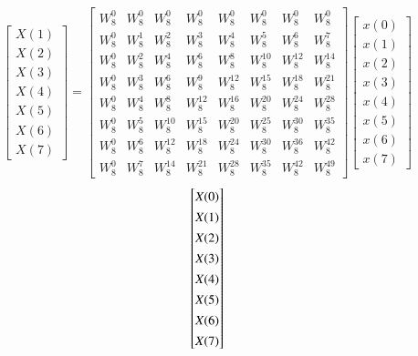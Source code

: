 \documentclass[journal,12pt,twocolumn]{IEEEtran}
\renewcommand\thesection{\arabic{section}}
\begin{document}
\begin{enumerate}[label=\thesection.\arabic*.,ref=\thesection.\theenumi]
\begin{equation}
\begin{bmatrix}
X(1) \\
X(2) \\
X(3) \\
X(4) \\
X(5) \\
X(6) \\
X(7)
\end{bmatrix}
=
\begin{bmatrix}
W^{0}_{8} & W^{0}_{8} & W^{0}_{8} & W^{0}_{8} & W^{0}_{8} & W^{0}_{8} & W^{0}_{8} & W^{0}_{8}\\
W^{0}_{8} & W^{1}_{8} & W^{2}_{8} & W^{3}_{8} & W^{4}_{8} & W^{5}_{8} & W^{6}_{8} & W^{7}_{8}\\
W^{0}_{8} & W^{2}_{8} & W^{4}_{8} & W^{6}_{8} & W^{8}_{8} & W^{10}_{8} & W^{12}_{8} & W^{14}_{8}\\
W^{0}_{8} & W^{3}_{8} & W^{6}_{8} & W^{9}_{8} & W^{12}_{8} & W^{15}_{8} & W^{18}_{8} & W^{21}_{8}\\
W^{0}_{8} & W^{4}_{8} & W^{8}_{8} & W^{12}_{8} & W^{16}_{8} & W^{20}_{8} & W^{24}_{8} & W^{28}_{8}\\
W^{0}_{8} & W^{5}_{8} & W^{10}_{8} & W^{15}_{8} & W^{20}_{8} & W^{25}_{8} & W^{30}_{8} & W^{35}_{8}\\
W^{0}_{8} & W^{6}_{8} & W^{12}_{8} & W^{18}_{8} & W^{24}_{8} & W^{30}_{8} & W^{36}_{8} & W^{42}_{8}\\
W^{0}_{8} & W^{7}_{8} & W^{14}_{8} & W^{21}_{8} & W^{28}_{8} & W^{35}_{8} & W^{42}_{8} & W^{49}_{8}
\end{bmatrix}
\begin{bmatrix}
x(0) \\
x(1) \\
x(2) \\
x(3) \\
x(4) \\
x(5) \\
x(6) \\
x(7)
\end{bmatrix}
\end{equation}
\begin{equation}
\renewcommand{\arraystretch}{1.35}
\setlength\arraycolsep{0.05pt}
\begin{bmatrix}
X(0) \\
X(1) \\
X(2) \\
X(3) \\
X(4) \\
X(5) \\
X(6) \\
X(7)
\end{bmatrix}

\end{equation}
\end{enumerate}
\end{document}
